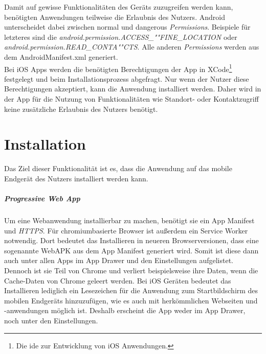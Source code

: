 Damit auf gewisse Funktionalitäten des Geräts zuzugreifen werden kann, benötigten Anwendungen teilweise die Erlaubnis des Nutzers.
Android unterscheidet dabei zwischen \glqq normal\grqq{} und \glqq dangerous\grqq{} \textit{Permissions}.
Beispiele für letzteres sind die \textit{android.permission.ACCESS\_""FINE\_LOCATION} oder \textit{android.permission.READ\_CONTA""CTS}.
Alle anderen \textit{Permissions} werden aus dem AndroidManifest.xml generiert.\\
Bei iOS Apps werden die benötigten Berechtigungen der App in XCode\footnote{Die \ac{ide} zur Entwicklung von iOS Anwendungen.} festgelegt und beim Installationsprozess abgefragt.
Nur wenn der Nutzer diese Berechtigungen akzeptiert, kann die Anwendung installiert werden.
Daher wird in der App für die Nutzung von Funktionalitäten wie Standort- oder Kontaktzugriff keine zusätzliche Erlaubnis des Nutzers benötigt.

\section{Installation}
Das Ziel dieser Funktionalität ist es, dass die Anwendung auf das mobile Endgerät des Nutzers installiert werden kann.

\subparagraph{Progressive Web App\\}
Um eine Webanwendung installierbar zu machen, benötigt sie ein App Manifest und \textit{HTTPS}.
Für chromiumbasierte Browser ist außerdem ein Service Worker notwendig.
Dort bedeutet das Installieren in neueren Browserversionen, dass eine sogenannte WebAPK aus dem App Manifest generiert wird.
Somit ist diese dann auch unter allen Apps im App Drawer und den Einstellungen aufgelistet.
Dennoch ist sie Teil von Chrome und verliert beispielsweise ihre Daten, wenn die Cache-Daten von Chrome geleert werden.
Bei iOS Geräten bedeutet das Installieren lediglich ein Lesezeichen für die Anwendung zum Startbildschirm des mobilen Endgeräts hinzuzufügen, wie es auch mit herkömmlichen Webseiten und -anwendungen möglich ist.
Deshalb erscheint die App weder im App Drawer, noch unter den Einstellungen.

